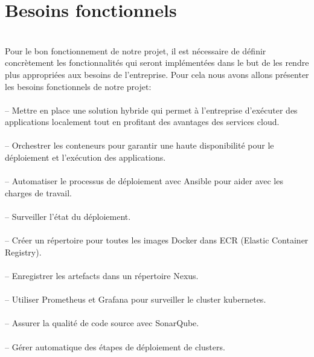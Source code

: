 \section{\LARGE Besoins fonctionnels}
\texttt{}\\[0.1cm]
 Pour le bon fonctionnement de notre projet, il est nécessaire de définir  concrètement les fonctionnalités qui seront implémentées dans le but de les rendre plus appropriées aux besoins de l'entreprise.
Pour cela nous avons allons présenter les besoins fonctionnels de notre projet:\\\texttt{}\\[0.01cm]
-- Mettre en place une solution hybride qui permet à l'entreprise d'exécuter des applications localement tout en profitant des avantages des services cloud.\\\texttt{}\\[0.01cm]
– Orchestrer les conteneurs pour garantir une haute disponibilité pour le déploiement et l'exécution des applications.\\\texttt{}\\[0.01cm]
– Automatiser le processus de déploiement avec Ansible pour aider avec les charges de travail.\\\texttt{}\\[0.01cm]
– Surveiller l’état du déploiement.\\\texttt{}\\[0.01cm]
– Créer un répertoire pour toutes les images Docker dans ECR (Elastic Container Registry).\\\texttt{}\\[0.01cm]
-- Enregistrer les artefacts dans un répertoire Nexus.\\\texttt{}\\[0.01cm]
– Utiliser Prometheus et Grafana pour surveiller le cluster kubernetes.\\\texttt{}\\[0.01cm]
– Assurer la qualité de code source avec SonarQube.\\\texttt{}\\[0.01cm]
– Gérer automatique des étapes de déploiement de clusters.


